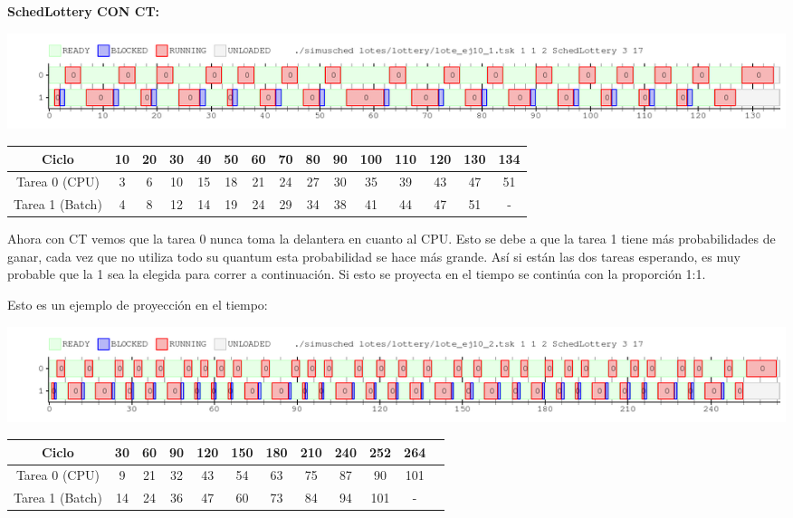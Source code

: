 \begin{flushleft}
\textbf{SchedLottery CON CT:}\end{flushleft} %

\begin{center}
 \includegraphics[scale=0.48]{./Lottery/ej10_CON_CT.png}
\end{center}

\begin{center}
\begin{tabular}{|c|c|c|c|c|c|c|c|c|c|c|c|c|c|c|}
\hline
Ciclo & 10 & 20 & 30 & 40 & 50 & 60 & 70 & 80 & 90 & 100 & 110 & 120 & 130 & 134 \\
\hline
\hline
Tarea 0 (CPU) & 3 & 6 & 10 & 15 & 18 & 21 & 24 & 27 & 30 & 35 & 39 & 43 & 47 & 51\\
\hline
Tarea 1 (Batch) & 4 & 8 & 12 & 14 & 19 & 24 & 29 & 34 & 38 & 41 & 44 & 47 & 51 & -\\
\hline
\end{tabular}\end{center}

Ahora con CT vemos que la tarea 0 nunca toma la delantera en cuanto al CPU. Esto se debe a que la tarea 1 tiene más probabilidades de ganar, cada vez que no utiliza 
todo su quantum esta probabilidad se hace más grande. Así si están las dos tareas esperando, es muy probable que la 1 sea la elegida para correr a continuación.
Si esto se proyecta en el tiempo se continúa con la proporción 1:1. 

Esto es un ejemplo de proyección en el tiempo:

\begin{center}
 \includegraphics[scale=0.48]{./Lottery/ej10_CON_CT_muchosciclos.png}
\end{center}

\begin{center}
\begin{tabular}{|c|c|c|c|c|c|c|c|c|c|c|c|}
\hline
Ciclo & 30 & 60 & 90 & 120 & 150 & 180 & 210 & 240 & 252 & 264\\
\hline
\hline
Tarea 0 (CPU) & 9 & 21 & 32 & 43 & 54 & 63 & 75 & 87 & 90 & 101\\
\hline
Tarea 1 (Batch) & 14 & 24 & 36 & 47 & 60 & 73 & 84 & 94 & 101 & -\\
\hline
\end{tabular}\end{center}


